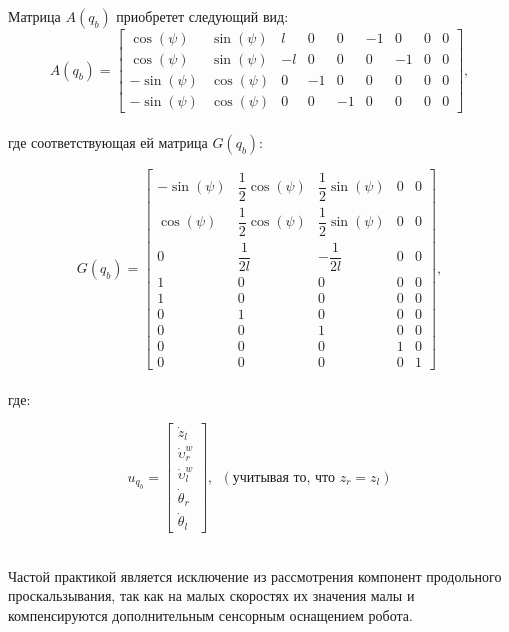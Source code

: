 \documentclass[14pt, a4paper]{extreport}
\begin{document}
\noindent
Матрица $A(q_b)$ приобретет следующий вид:
\newpage
\
\begin{equation}
A(q_b) = 
\begin{bmatrix}
\cos(\psi)  & \sin(\psi) &  l &  0 &  0 & -1 &  0 & 0 & 0\\[1mm]
\cos(\psi)  & \sin(\psi) & -l &  0 &  0 &  0 & -1 & 0 & 0\\[1mm]
-\sin(\psi) & \cos(\psi) &  0 & -1 &  0 &  0 &  0 & 0 & 0\\[1mm]
-\sin(\psi) & \cos(\psi) &  0 &  0 & -1 &  0 &  0 & 0 & 0
\end{bmatrix},
\tag{32} \label{eq:32}
\end{equation}
\ \\
\noindent
где соответствующая ей матрица $G(q_b)$:

\begin{equation}
G(q_b) = 
\begin{bmatrix}
-\sin(\psi)  & \dfrac{1}{2}\cos(\psi) &  \dfrac{1}{2}\sin(\psi) &  0 &  0 \\[3mm]
\cos(\psi)   & \dfrac{1}{2}\cos(\psi) &  \dfrac{1}{2}\sin(\psi) &  0 &  0 \\[3mm]
0 & \dfrac{1}{2l} &  -\dfrac{1}{2l} & 0 &  0\\[2mm]
1 & 0 &  0 &  0 & 0\\[1mm]
1 & 0 &  0 &  0 & 0\\[1mm]
0 & 1 &  0 &  0 & 0\\[1mm]
0 & 0 &  1 &  0 & 0\\[1mm]
0 & 0 &  0 &  1 & 0\\[1mm]
0 & 0 &  0 &  0 & 1
\end{bmatrix},
\tag{33} \label{eq:33}
\end{equation}
\ \\

\noindent
где:

\begin{equation}
u_{q_b} = 
\begin{bmatrix}
\dot{z}_l \\[1mm] \dot{\upsilon}_r^w \\[1mm] \dot{\upsilon}_l^w \\[1mm] \dot{\theta}_r \\[1mm] \dot{\theta}_l
\end{bmatrix}, \ \ (\text{учитывая то, что } z_r = z_l)
\tag{34} \label{eq:34}
\end{equation}
\ 

Частой практикой является исключение из рассмотрения компонент продольного проскальзывания, так как на малых скоростях их значения малы и компенсируются дополнительным сенсорным оснащением робота. 
\end{document}
